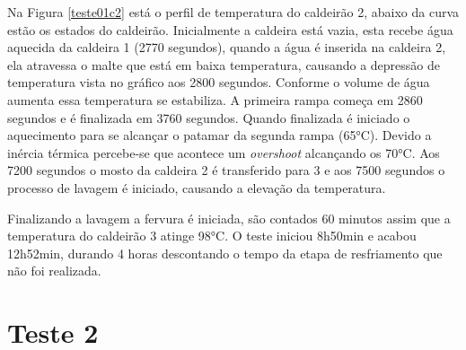 Na Figura \ref{teste01c2} está o perfil de temperatura do caldeirão 2, abaixo da curva estão os estados do caldeirão. Inicialmente a caldeira está vazia, esta recebe água aquecida da caldeira 1 (2770 segundos), quando a água é inserida na caldeira 2, ela atravessa o malte que está em baixa temperatura, causando a depressão de temperatura vista no gráfico aos 2800 segundos. Conforme o volume de água aumenta essa temperatura se estabiliza. A primeira rampa começa em 2860 segundos e é finalizada em 3760 segundos. Quando finalizada é iniciado o aquecimento para se alcançar o patamar da segunda rampa (65°C). Devido a inércia térmica percebe-se que acontece um \textit{overshoot} alcançando os 70°C. Aos 7200 segundos o mosto da caldeira 2 é transferido para 3 e aos 7500 segundos o processo de lavagem é iniciado, causando a elevação da temperatura.

Finalizando a lavagem a fervura é iniciada, são contados 60 minutos assim que a temperatura do caldeirão 3 atinge 98°C. O teste iniciou 8h50min e acabou 12h52min, durando 4 horas descontando o tempo da etapa de resfriamento que não foi realizada. 


	\section{Teste 2}

